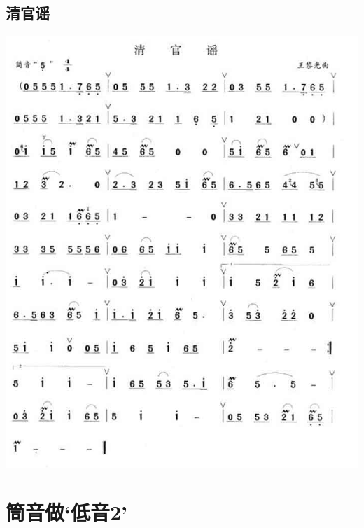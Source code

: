 \documentclass[cn,pad,chinese,chinesefont=nofont]{elegantbook}
\begin{document}
\section{清官谣}
    \includegraphics[width=\textwidth]{dongxiao/20200323清官谣.jpg}


\chapter{筒音做‘低音2’}
\end{document}
